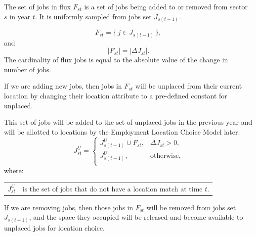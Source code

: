The set of jobs in flux $F_{st}$ is a set of jobs being
added to or removed from sector $s$ in year $t$. It is
uniformly sampled from jobs set $J_{s(t-1)}$.

\begin{equation}
F_{st} = \{\, j \in J_{s(t-1)} \,\},
\end{equation}
and
\begin{equation}
| F_{st} | = | \Delta J_{st} |.
\end{equation}
%
The cardinality of flux jobs is equal to the absolute value of the
change in number of jobs.

If we are adding new jobs, then jobs in $F_{st}$ will be
unplaced from their current location by changing their
location attribute to a pre-defined constant for unplaced.


This set of jobs will be added to the set of unplaced jobs
in the previous year and will be allotted to locations by
the Employment Location Choice Model later.
\begin{equation}
J^U_{st} = \begin{cases}
        J^U_{s(t-1)} \cup F_{st}, & \Delta J_{st} > 0,\\
        J^U_{s(t-1)}, & \text{otherwise},\\
    \end{cases}
\end{equation}
where:
\begin{center}
\begin{tabular}{c p{5.5in}}
$J^U_{st}$ & is the set of jobs that do not have a location match at time $t$.\\
\end{tabular}
\end{center}

If we are removing jobs, then those jobs in $F_{st}$ will be
removed from jobs set $J_{s(t-1)}$, and the space they
occupied will be released and become available to unplaced
jobs for location choice.

